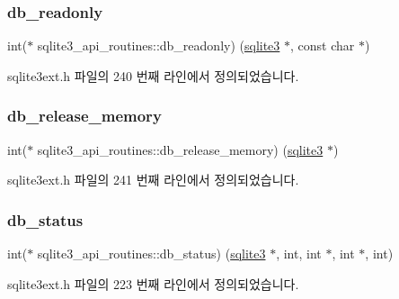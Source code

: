 \subsubsection{\texorpdfstring{db\+\_\+readonly}{db\_readonly}}
{\footnotesize\ttfamily int($\ast$ sqlite3\+\_\+api\+\_\+routines\+::db\+\_\+readonly) (\hyperlink{sqlite3_8h_a0ef6f2646262c8a9b24368d8ac140f69}{sqlite3} $\ast$, const char $\ast$)}



sqlite3ext.\+h 파일의 240 번째 라인에서 정의되었습니다.

\mbox{\label{structsqlite3__api__routines_a32bf57d7ff76e4153ca7fe2552bd168f}} 
\subsubsection{\texorpdfstring{db\+\_\+release\+\_\+memory}{db\_release\_memory}}
{\footnotesize\ttfamily int($\ast$ sqlite3\+\_\+api\+\_\+routines\+::db\+\_\+release\+\_\+memory) (\hyperlink{sqlite3_8h_a0ef6f2646262c8a9b24368d8ac140f69}{sqlite3} $\ast$)}



sqlite3ext.\+h 파일의 241 번째 라인에서 정의되었습니다.

\mbox{\label{structsqlite3__api__routines_ab0ae4fb049a3157617d73eb6a944d567}} 
\subsubsection{\texorpdfstring{db\+\_\+status}{db\_status}}
{\footnotesize\ttfamily int($\ast$ sqlite3\+\_\+api\+\_\+routines\+::db\+\_\+status) (\hyperlink{sqlite3_8h_a0ef6f2646262c8a9b24368d8ac140f69}{sqlite3} $\ast$, int, int $\ast$, int $\ast$, int)}



sqlite3ext.\+h 파일의 223 번째 라인에서 정의되었습니다.

\mbox{\label{structsqlite3__api__routines_abe47369f89df1193ca28751e8d024818}} 
